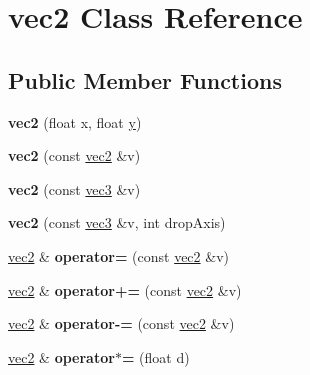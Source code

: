 \hypertarget{classvec2}{\section{vec2 Class Reference}
\label{classvec2}
}
\subsection*{Public Member Functions}
\begin{DoxyCompactItemize}
\item 
\hypertarget{classvec2_a9486933da4d4d819a8b99bae91066cb3}{{\bfseries vec2} (float x, float \hyperlink{_ice_utils_8h_aa7ffaed69623192258fb8679569ff9ba}{y})}\label{classvec2_a9486933da4d4d819a8b99bae91066cb3}

\item 
\hypertarget{classvec2_a7cd74dc60ec8bd02df85508cbdf1e0fd}{{\bfseries vec2} (const \hyperlink{classvec2}{vec2} \&v)}\label{classvec2_a7cd74dc60ec8bd02df85508cbdf1e0fd}

\item 
\hypertarget{classvec2_aae5f9f22b370adf75cd730c96c891c15}{{\bfseries vec2} (const \hyperlink{classvec3}{vec3} \&v)}\label{classvec2_aae5f9f22b370adf75cd730c96c891c15}

\item 
\hypertarget{classvec2_ac9a3a5609eca8ebe9767919c6ac028c6}{{\bfseries vec2} (const \hyperlink{classvec3}{vec3} \&v, int drop\+Axis)}\label{classvec2_ac9a3a5609eca8ebe9767919c6ac028c6}

\item 
\hypertarget{classvec2_aa287a5be89cde7e32c38f31d60667efd}{\hyperlink{classvec2}{vec2} \& {\bfseries operator=} (const \hyperlink{classvec2}{vec2} \&v)}\label{classvec2_aa287a5be89cde7e32c38f31d60667efd}

\item 
\hypertarget{classvec2_a67b9be8b71f13abba9d2cf7a41540a9d}{\hyperlink{classvec2}{vec2} \& {\bfseries operator+=} (const \hyperlink{classvec2}{vec2} \&v)}\label{classvec2_a67b9be8b71f13abba9d2cf7a41540a9d}

\item 
\hypertarget{classvec2_aeb9ecb6878a3d8a04ecb5a00daf19742}{\hyperlink{classvec2}{vec2} \& {\bfseries operator-\/=} (const \hyperlink{classvec2}{vec2} \&v)}\label{classvec2_aeb9ecb6878a3d8a04ecb5a00daf19742}

\item 
\hypertarget{classvec2_aab20fa966f702f2c1a7a472f6c64e657}{\hyperlink{classvec2}{vec2} \& {\bfseries operator$\ast$=} (float d)}\label{classvec2_aab20fa966f702f2c1a7a472f6c64e657}


\end{DoxyCompactItemize}
